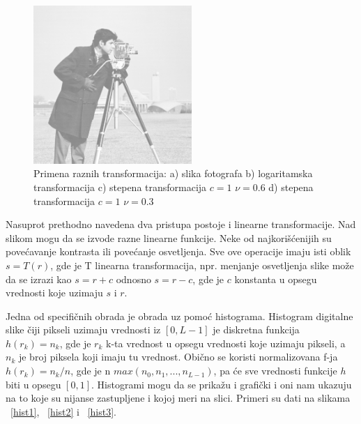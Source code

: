 \documentclass[a4paper,12pt,titlepage]{article}
\begin{document}
\begin{figure}[ht!]
\includegraphics[width=60mm]{img/imgPow2.png}
\caption{Primena raznih transformacija: a) slika fotografa b) logaritamska transformacija c) stepena transformacija $c = 1$ $\nu = 0.6$ d) stepena transformacija $c = 1$ $\nu = 0.3$}
\label{transf}
\end{figure} 

Nasuprot prethodno navedena dva pristupa postoje i linearne transformacije. Nad slikom mogu da se izvode razne linearne funkcije. Neke od najkorišćenijih su povećavanje kontrasta ili povećanje osvetljenja. Sve ove operacije imaju isti oblik $s = T(r)$, gde je T linearna transformacija, npr. menjanje osvetljenja slike može da se izrazi kao $s = r + c$ odnosno $s = r - c$, gde je $c$ konstanta u opsegu vrednosti koje uzimaju $s$ i $r$. 

Jedna od specifičnih obrada je obrada uz pomoć histograma. Histogram digitalne slike čiji pikseli uzimaju vrednosti iz $[0, L - 1]$ je diskretna funkcija $h(r_{k}) = n_{k}$, gde je $r_{k}$ k-ta vrednost u opsegu vrednosti koje uzimaju pikseli, a $n_{k}$ je broj piksela koji imaju tu vrednost. Obično se koristi normalizovana f-ja $h(r_{k}) = n_{k}/n$, gde je n $max(n_{0}, n_{1}, ... , n_{L - 1})$, pa će sve vrednosti funkcije $h$ biti u opsegu $[0, 1]$. Histogrami mogu da se prikažu i grafički i oni nam ukazuju na to koje su nijanse zastupljene i kojoj meri na slici. Primeri su dati na slikama ~\ref{hist1}, ~\ref{hist2} i ~\ref{hist3}.
\end{document}
